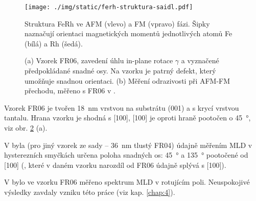 \begin{figure}[htbp]
    \centering
    \texttt{[image: ./img/static/ferh-struktura-saidl.pdf]}
    \caption{Struktura FeRh ve AFM (vlevo) a FM (vpravo) fázi.
        Šipky naznačují orientaci magnetických momentů jednotlivých atomů Fe (bílá) a Rh (šedá). \cite{saidlInvestigationMagnetostructuralPhase2016}}
    \label{fig:ferh-struktura}
\end{figure}

\begin{figure}[htbp]
    \centering
    
    \caption{(a) Vzorek FR06, zavedení úhlu in-plane rotace $\gamma$ a vyznačené předpokládané snadné osy.
    Na vzorku je patrný defekt, který umožňuje snadnou orientaci. (b) Měření odrazivosti při AFM-FM přechodu, měřeno s FR06 v \cite{kubascikMagnetooptickeStudiumAntiferomagnetickych2019}.}
    \label{fig:vzorek-ferh}
\end{figure}

Vzorek FR06 je tvořen \SI{18}{\nano\meter} vrstvou  na substrátu (001) a s krycí vrstvou tantalu.
Hrana vzorku je shodná s  [100],  [100] je oproti hraně pootočen o \SI{45}{\degree}, viz obr. \ref{fig:vzorek-ferh} (a).

V \cite{brajerLaserovaSpektroskopieMaterialu2015} byla (pro jiný vzorek ze sady -- \SI{36}{\nano\meter} tlustý FR04) údajně měřením MLD v hysterezních smyčkách určena poloha snadných os: \SI{45}{\degree} a \SI{135}{\degree} pootočené od  [100] (, které v daném vzorku narozdíl od FR06 údajně splývá s  [100]).

V \cite{kubascikMagnetooptickeStudiumAntiferomagnetickych2019} bylo ve vzorku FR06 měřeno spektrum MLD v rotujícím poli.
Neuspokojivé výsledky zavdaly vzniku této práce (viz kap. \ref{chap:4}).

